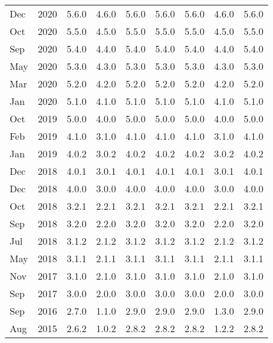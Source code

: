 \begin{xtabular}{|ll|c|c|c|c|c|c|c|}
Dec & 2020 & 5.6.0 & 4.6.0 & 5.6.0 & 5.6.0 & 5.6.0 & 4.6.0 & 5.6.0 \\
Oct & 2020 & 5.5.0 & 4.5.0 & 5.5.0 & 5.5.0 & 5.5.0 & 4.5.0 & 5.5.0 \\
Sep & 2020 & 5.4.0 & 4.4.0 & 5.4.0 & 5.4.0 & 5.4.0 & 4.4.0 & 5.4.0 \\
May & 2020 & 5.3.0 & 4.3.0 & 5.3.0 & 5.3.0 & 5.3.0 & 4.3.0 & 5.3.0 \\
Mar & 2020 & 5.2.0 & 4.2.0 & 5.2.0 & 5.2.0 & 5.2.0 & 4.2.0 & 5.2.0 \\
Jan & 2020 & 5.1.0 & 4.1.0 & 5.1.0 & 5.1.0 & 5.1.0 & 4.1.0 & 5.1.0 \\
Oct & 2019 & 5.0.0       & 4.0.0       & 5.0.0         & 5.0.0       & 5.0.0       & 4.0.0       & 5.0.0\\
Feb & 2019 & 4.1.0       & 3.1.0       & 4.1.0         & 4.1.0       & 4.1.0       & 3.1.0       & 4.1.0\\
Jan & 2019 & 4.0.2       & 3.0.2       & 4.0.2         & 4.0.2       & 4.0.2       & 3.0.2       & 4.0.2\\
Dec & 2018 & 4.0.1       & 3.0.1       & 4.0.1         & 4.0.1       & 4.0.1       & 3.0.1       & 4.0.1\\
Dec & 2018 & 4.0.0       & 3.0.0       & 4.0.0         & 4.0.0       & 4.0.0       & 3.0.0       & 4.0.0\\
Oct & 2018 & 3.2.1       & 2.2.1       & 3.2.1         & 3.2.1       & 3.2.1       & 2.2.1       & 3.2.1\\
Sep & 2018 & 3.2.0       & 2.2.0       & 3.2.0         & 3.2.0       & 3.2.0       & 2.2.0       & 3.2.0\\
Jul & 2018 & 3.1.2       & 2.1.2       & 3.1.2         & 3.1.2       & 3.1.2       & 2.1.2       & 3.1.2\\
May & 2018 & 3.1.1       & 2.1.1       & 3.1.1         & 3.1.1       & 3.1.1       & 2.1.1       & 3.1.1\\
Nov & 2017 & 3.1.0       & 2.1.0       & 3.1.0         & 3.1.0       & 3.1.0       & 2.1.0       & 3.1.0\\
Sep & 2017 & 3.0.0       & 2.0.0       & 3.0.0         & 3.0.0       & 3.0.0       & 2.0.0       & 3.0.0\\
Sep & 2016 & 2.7.0       & 1.1.0       & 2.9.0         & 2.9.0       & 2.9.0       & 1.3.0       & 2.9.0\\
Aug & 2015 & 2.6.2       & 1.0.2       & 2.8.2         & 2.8.2       & 2.8.2       & 1.2.2       & 2.8.2\\

\end{xtabular}
